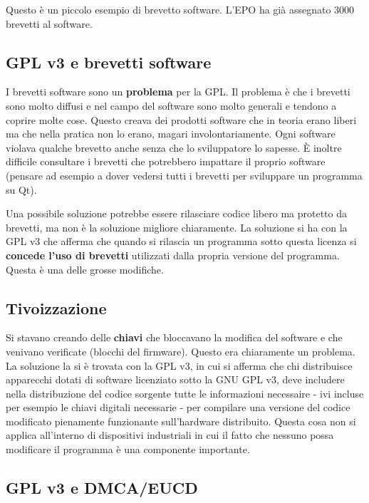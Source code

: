 Questo è un piccolo esempio di brevetto software. L'EPO ha già assegnato 3000 brevetti al software.

\subsection{GPL v3 e brevetti software}

I brevetti software sono un \textbf{problema} per la GPL. Il problema è che i brevetti sono molto diffusi e nel campo del software sono molto generali e tendono a coprire molte cose. 
Questo creava dei prodotti software che in teoria erano liberi ma che nella pratica non lo erano, magari involontariamente. Ogni software violava qualche brevetto anche senza che lo sviluppatore lo sapesse. 
È inoltre difficile consultare i brevetti che potrebbero impattare il proprio software (pensare ad esempio a dover vedersi tutti i brevetti per sviluppare un programma su Qt).

Una possibile soluzione potrebbe essere rilasciare codice libero ma protetto da brevetti, ma non è la soluzione migliore chiaramente. La soluzione si ha con la GPL v3 che afferma che quando si rilascia un programma sotto questa licenza si \textbf{concede l'uso di brevetti} utilizzati dalla propria versione del programma. Questa è una delle grosse modifiche.

\subsection{Tivoizzazione}

Si stavano creando delle \textbf{chiavi} che bloccavano la modifica del software e che venivano verificate (blocchi del firmware). Questo era chiaramente un problema. La soluzione la si è trovata con la GPL v3, in cui si afferma che chi distribuisce apparecchi dotati di software licenziato sotto la GNU GPL v3, deve includere nella distribuzione del codice sorgente tutte le informazioni necessaire - ivi incluse per esempio le chiavi digitali necessarie - per compilare una versione del codice modificato pienamente funzionante sull'hardware distribuito. Questa cosa non si applica all'interno di dispositivi industriali in cui il fatto che nessuno possa modificare il programma è una componente importante.

\subsection{GPL v3 e DMCA/EUCD}

